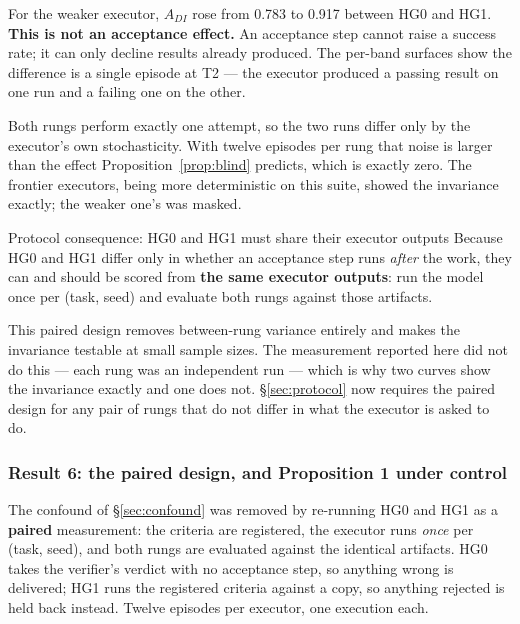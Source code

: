 \documentclass[11pt]{article}
\theoremstyle{definition}
\begin{document}
For the weaker executor, $A_{DI}$ rose from 0.783 to 0.917 between HG0 and HG1. \textbf{This is not an acceptance effect.} An acceptance step cannot raise a success rate; it can only decline results already produced. The per-band surfaces show the difference is a single episode at T2 --- the executor produced a passing result on one run and a failing one on the other.

Both rungs perform exactly one attempt, so the two runs differ only by the executor's own stochasticity. With twelve episodes per rung that noise is larger than the effect Proposition~\ref{prop:blind} predicts, which is exactly zero. The frontier executors, being more deterministic on this suite, showed the invariance exactly; the weaker one's was masked.

\begin{cautionbox}{Protocol consequence: HG0 and HG1 must share their executor outputs}
Because HG0 and HG1 differ only in whether an acceptance step runs \emph{after} the work, they can and should be scored from \textbf{the same executor outputs}: run the model once per (task, seed) and evaluate both rungs against those artifacts.

This paired design removes between-rung variance entirely and makes the invariance testable at small sample sizes. The measurement reported here did not do this --- each rung was an independent run --- which is why two curves show the invariance exactly and one does not. \S\ref{sec:protocol} now requires the paired design for any pair of rungs that do not differ in what the executor is asked to do.
\end{cautionbox}

\subsubsection{Result 6: the paired design, and Proposition 1 under control}\label{sec:paired}

The confound of \S\ref{sec:confound} was removed by re-running HG0 and HG1 as a
\textbf{paired} measurement: the criteria are registered, the executor runs
\emph{once} per (task, seed), and both rungs are evaluated against the identical
artifacts. HG0 takes the verifier's verdict with no acceptance step, so anything
wrong is delivered; HG1 runs the registered criteria against a copy, so anything
rejected is held back instead. Twelve episodes per executor, one execution each.
\end{document}
